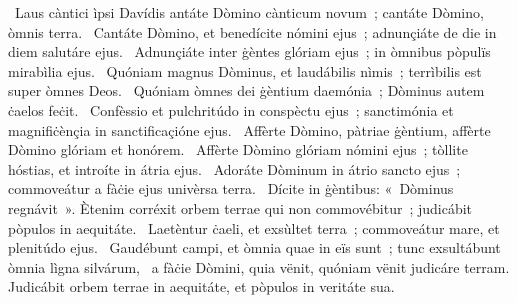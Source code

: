 {~Laus càntici ìpsi Davídis}
{%
antáte Dòmino cànticum novum~; cantáte Dòmino, òmnis terra.
~Cantáte Dòmino, et benedícite nómini ejus~; adnunçiáte de die in diem salutáre ejus.
~Adnunçiáte inter ġèntes glóriam ejus~; in òmnibus pòpulïs mirabìlia ejus.
~Quóniam magnus Dòminus, et laudábilis nìmis~; terrìbilis est super òmnes Deos.
~Quóniam òmnes dei ġèntium daemónia~; Dòminus autem ċaelos feċit.
~Confèssio et pulchritúdo in conspèctu ejus~; sanctimónia et magnifiċènçia in sanctificaçióne ejus.
~Affèrte Dòmino, pàtriae ġèntium, affèrte Dòmino glóriam et honórem.
~Affèrte Dòmino glóriam nómini ejus~; tòllite hóstias, et introíte in átria ejus.
~Adoráte Dòminum in átrio sancto ejus~; commoveátur a fàċie ejus univèrsa terra.
~Dícite in ġèntibus: «~Dòminus regnávit~». Ètenim corréxit orbem terrae qui non commovébitur~; judicábit pòpulos in aequitáte.
~Laetèntur ċaeli, et exsùltet terra~; commoveátur mare, et plenitúdo ejus.
~Gaudébunt campi, et òmnia quae in eïs sunt~; tunc exsultábunt òmnia lìgna silvárum,
~a fàċie Dòmini, quia vënit, quóniam vënit judicáre terram. Judicábit orbem terrae in aequitáte, et pòpulos in veritáte sua.}
